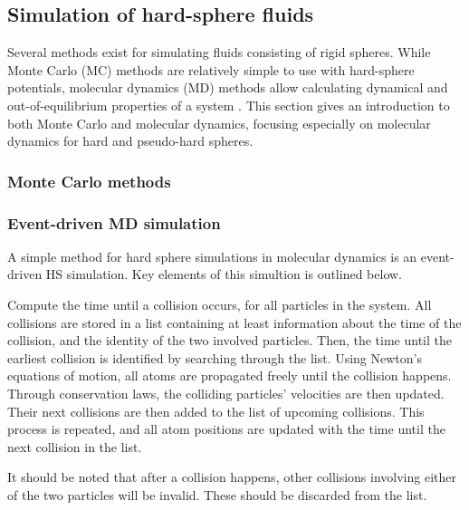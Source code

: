 
\subsection{Simulation of hard-sphere fluids}
Several methods exist for simulating fluids consisting of rigid spheres.
While Monte Carlo (MC) methods are relatively simple to use with hard-sphere potentials, 
molecular dynamics (MD) methods allow calculating dynamical and out-of-equilibrium 
properties of a system \cite{ref:allen:MD_sim}.
This section gives an introduction to both Monte Carlo and molecular dynamics,
focusing especially on molecular dynamics for hard and pseudo-hard spheres.

\subsubsection{Monte Carlo methods}
\subsubsection{Event-driven MD simulation}
A simple method for hard sphere simulations in molecular dynamics is an
event-driven HS simulation.
Key elements of this simultion is outlined below.

Compute the time until a collision occurs, for all particles in the system.
All collisions are stored in a list containing at least information about
the time of the collision, and the identity of the two involved particles.
Then, the time until the earliest collision is identified by searching through the list.
Using Newton's equations of motion, all atoms are propagated freely until
the collision happens.
Through conservation laws, the colliding particles' velocities are then updated.
Their next collisions are then added to the list of upcoming collisions.
This process is repeated, and all atom positions are updated with the time 
until the next collision in the list.

It should be noted that after a collision happens, other collisions involving
either of the two particles will be invalid.
These should be discarded from the list.

